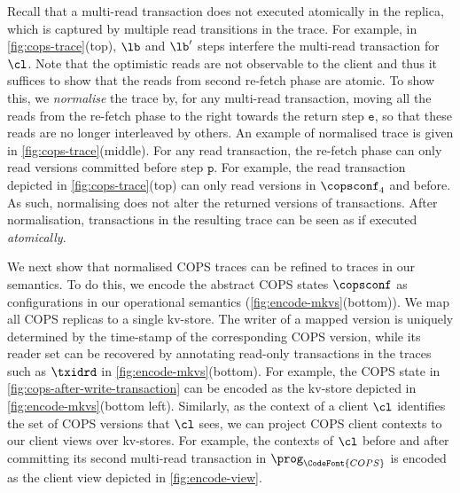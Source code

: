 Recall that a multi-read transaction does not executed atomically in the replica,
which is captured by multiple read transitions in the trace.
For example, in \cref{fig:cops-trace}(top), \( \lb\) and \( \lb' \) steps 
interfere the multi-read transaction for \( \cl \).
Note that the optimistic reads are not observable to the client and
thus it suffices to show that the reads from second re-fetch phase are atomic.
To show this, we \emph{normalise} the trace 
by, for any multi-read transaction, 
moving all the reads from the re-fetch phase to the right towards the return step \( \mathtt{e}\),
so that these reads are no longer interleaved by others.
An example of normalised trace is given in \cref{fig:cops-trace}(middle).
For any read transaction,
the re-fetch phase can only read versions committed before step \( \mathtt{p}\).
For example, the read transaction depicted in \cref{fig:cops-trace}(top) 
can only read versions in \( \copsconf_4 \) and before.
As such, normalising does not alter the returned versions of transactions.
After normalisation, transactions in the resulting trace can be seen as if executed \emph{atomically}. 

We next show that normalised COPS traces can be refined to traces in our semantics.
To do this, we encode the abstract COPS states \(\copsconf \) as configurations
in our operational semantics (\cref{fig:encode-mkvs}(bottom)). 
We map all COPS replicas to a single kv-store.
The writer of a mapped version is uniquely
determined by the time-stamp of the corresponding COPS version, 
while its reader set 
can be recovered by annotating read-only transactions in the traces such as \( \txidrd \) in \cref{fig:encode-mkvs}(bottom).
For example, the COPS state in \cref{fig:cops-after-write-transaction}
can be encoded as the kv-store depicted in \cref{fig:encode-mkvs}(bottom left).
Similarly, as the context of a client $\cl$ identifies the set of COPS versions that $\cl$ sees, 
we can project COPS client contexts to our client views over kv-stores. 
For example, the contexts of \( \cl \) 
before and after committing its second multi-read transaction in \( \prog_{\CodeFont{COPS}} \) 
is encoded as the client view depicted in \cref{fig:encode-view}.



